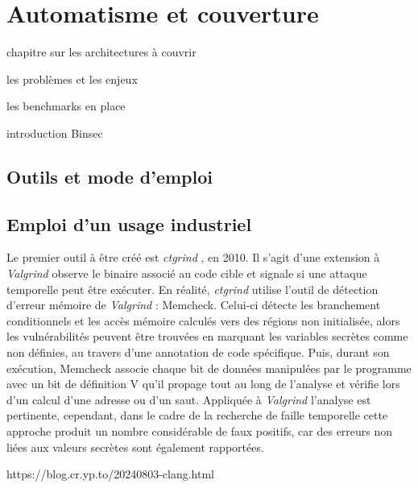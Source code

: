 \chapter{Automatisme et couverture}
\label{chap:automateVerifAutomatisme}

chapitre sur les architectures à couvrir 

les problèmes et les enjeux

les benchmarks en place

introduction Binsec


\section{Outils et mode d'emploi}


\section{Emploi d'un usage industriel}

Le premier outil à être créé est \textit{ctgrind} \cite{ctgrind}, en 2010. Il s'agit d'une extension à \textit{Valgrind} observe le binaire associé au code cible et signale si une attaque temporelle peut être exécuter. En réalité, \textit{ctgrind} utilise l'outil de détection d'erreur mémoire de \textit{Valgrind} : Memcheck. Celui-ci détecte les branchement conditionnels et les accès mémoire calculés vers des régions non initialisée, alors les vulnérabilités peuvent être trouvées en marquant les variables secrètes comme non définies, au travers d'une annotation de code spécifique. Puis, durant son exécution, Memcheck associe chaque bit de données manipulées par le programme avec un bit de définition V qu'il propage tout au long de l'analyse et vérifie lors d'un calcul d'une adresse ou d'un saut. Appliquée à \textit{Valgrind} l'analyse est pertinente, cependant, dans le cadre de la recherche de faille temporelle cette approche produit un nombre considérable de faux positifs, car des erreurs non liées aux valeurs secrètes sont également rapportées.\medbreak




https://blog.cr.yp.to/20240803-clang.html